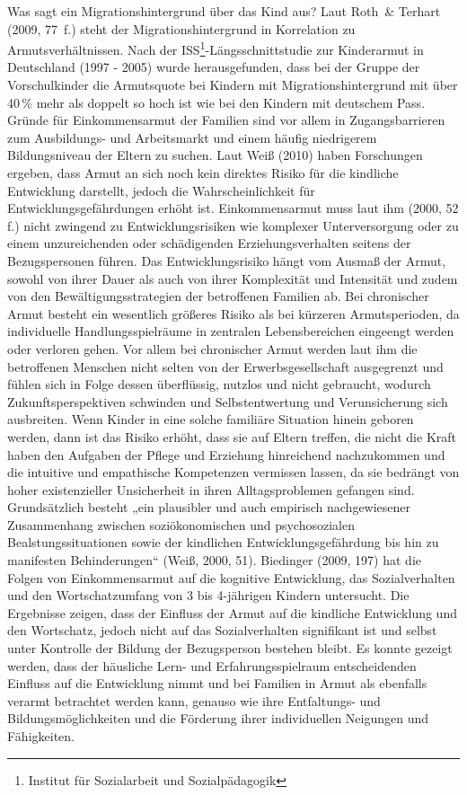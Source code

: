 Was sagt ein Migrationshintergrund über das Kind aus? Laut Roth~\& Terhart (2009, 77~f.) steht der Migrationshintergrund in Korrelation zu Armutsverhältnissen. 
Nach der ISS\footnote{Institut für Sozialarbeit und Sozialpädagogik}-Längsschnittstudie zur Kinderarmut in Deutschland (1997 - 2005) wurde herausgefunden, dass bei der Gruppe der Vorschulkinder die Armutsquote bei Kindern mit Migrationshintergrund mit über 40\,\% mehr als doppelt so hoch ist wie bei den Kindern mit deutschem Pass. Gründe für Einkommensarmut der Familien sind vor allem in Zugangsbarrieren zum Ausbildungs- und Arbeitsmarkt und einem häufig niedrigerem Bildungsniveau der Eltern zu suchen.
Laut Weiß (2010) haben Forschungen ergeben, dass Armut an sich noch kein direktes Risiko für die kindliche Entwicklung darstellt, jedoch die Wahrscheinlichkeit für Entwicklungsgefährdungen erhöht ist. 
Einkommensarmut muss laut ihm (2000, 52 f.) nicht zwingend zu Entwicklungsrisiken wie komplexer Unterversorgung oder zu einem unzureichenden oder schädigenden Erziehungsverhalten seitens der Bezugspersonen führen. Das Entwicklungsrisiko hängt vom Ausmaß der Armut, sowohl von ihrer Dauer als auch von ihrer Komplexität und Intensität und zudem von den Bewältigungsstrategien der betroffenen Familien ab. Bei chronischer Armut besteht ein wesentlich größeres Risiko als bei kürzeren Armutsperioden, da individuelle Handlungsspielräume in zentralen Lebensbereichen eingeengt werden oder verloren gehen.
Vor allem bei chronischer Armut werden laut ihm die betroffenen Menschen nicht selten von der Erwerbsgesellschaft ausgegrenzt und fühlen sich in Folge dessen überflüssig, nutzlos und nicht gebraucht, wodurch Zukunftsperspektiven schwinden und Selbstentwertung und Verunsicherung sich ausbreiten. Wenn Kinder in eine solche familiäre Situation hinein geboren werden, dann ist das Risiko erhöht, dass sie auf Eltern treffen, die nicht die Kraft haben den Aufgaben der Pflege und Erziehung hinreichend nachzukommen und die intuitive und empathische Kompetenzen vermissen lassen, da sie bedrängt von hoher existenzieller Unsicherheit in ihren Alltagsproblemen gefangen sind.   
Grundsätzlich besteht „ein plausibler und auch empirisch nachgewiesener Zusammenhang zwischen soziökonomischen und psychosozialen Bealstungssituationen sowie der kindlichen Entwicklungsgefährdung bis hin zu manifesten Behinderungen“ (Weiß, 2000, 51).
Biedinger (2009, 197) hat die Folgen von Einkommensarmut auf die kognitive Entwicklung, das Sozialverhalten und den Wortschatzumfang von 3 bis 4-jährigen Kindern untersucht. Die Ergebnisse zeigen, dass der Einfluss der Armut auf die kindliche Entwicklung und den Wortschatz, jedoch nicht auf das Sozialverhalten signifikant ist und selbst unter Kontrolle der Bildung der Bezugsperson bestehen bleibt. Es konnte gezeigt werden, dass der häusliche Lern- und Erfahrungsspielraum entscheidenden Einfluss auf die Entwicklung nimmt und bei Familien in Armut als ebenfalls verarmt betrachtet werden kann, genauso wie ihre Entfaltungs- und Bildungsmöglichkeiten und die Förderung ihrer individuellen Neigungen und Fähigkeiten.
 
